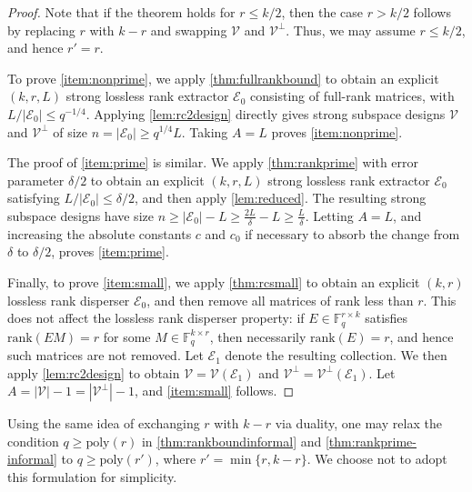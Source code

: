 \documentclass[11pt]{article}
\newcommand{\rank}{\mathrm{rank}}
\newcommand{\F}{\mathbb{F}}
\newcommand{\poly}{\mathrm{poly}}
\begin{document}
\begin{proof}
Note that if the theorem holds for $r\le k/2$, then the case $r>k/2$ follows by replacing $r$ with $k-r$ and swapping $\mathcal{V}$ and $\mathcal{V}^\perp$. Thus, we may assume $r\le k/2$, and hence $r'=r$. %

To prove \cref{item:nonprime}, we apply \cref{thm:fullrankbound} to obtain an explicit $(k,r,L)$ strong lossless rank extractor $\mathcal{E}_0$ consisting of full-rank matrices, with $L/|\mathcal{E}_0|\le q^{-1/4}$. 
Applying \cref{lem:rc2design} directly gives strong subspace designs
$\mathcal{V}$ and $\mathcal{V}^\perp$ of size $n=|\mathcal{E}_0|\ge q^{1/4}L$.
Taking $A=L$ proves \cref{item:nonprime}.

The proof of \cref{item:prime} is similar. We apply \cref{thm:rankprime} with error parameter $\delta/2$ to obtain an explicit $(k,r,L)$ strong lossless rank extractor $\mathcal{E}_0$ satisfying $L/|\mathcal{E}_0|\le \delta/2$, and then apply \cref{lem:reduced}. The resulting strong subspace designs have size
$n\ge |\mathcal{E}_0|-L\ge \frac{2L}{\delta}-L\ge \frac{L}{\delta}$.
Letting $A=L$, and increasing the absolute constants $c$ and $c_0$ if necessary to absorb the change from $\delta$ to $\delta/2$, proves \cref{item:prime}.

Finally, to prove \cref{item:small}, we apply \cref{thm:rcsmall} to obtain an explicit $(k,r)$ lossless rank disperser $\mathcal{E}_0$, and then remove all matrices of rank less than $r$. This does not affect the lossless rank disperser property: if $E\in\F_q^{r\times k}$ satisfies $\rank(EM)=r$ for some $M\in\F_q^{k\times r}$, then necessarily $\rank(E)=r$, and hence such matrices are not removed. Let $\mathcal{E}_1$ denote the resulting collection. We then apply \cref{lem:rc2design} to obtain $\mathcal{V}=\mathcal{V}(\mathcal{E}_1)$ and $\mathcal{V}^\perp=\mathcal{V}^\perp(\mathcal{E}_1)$. Let $A=|\mathcal{V}|-1=|\mathcal{V}^\perp|-1$, and \cref{item:small} follows.
\end{proof}

\begin{remark}
Using the same idea of exchanging $r$ with $k-r$ via duality, one may relax the condition $q\geq \poly(r)$ in \cref{thm:rankboundinformal} and \cref{thm:rankprime-informal} to $q\geq \poly(r')$, where $r'=\min\{r,k-r\}$. We choose not to adopt this formulation for simplicity.
\end{remark}
\end{document}
